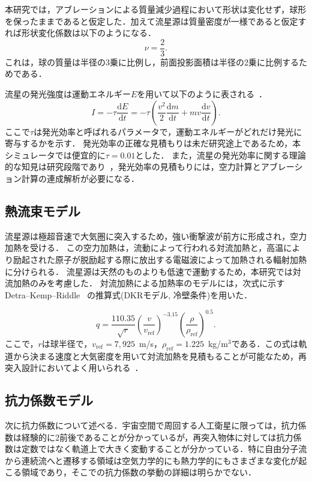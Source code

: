 本研究では，アブレーションによる質量減少過程において形状は変化せず，球形を保ったままであると仮定した．加えて流星源は質量密度が一様であると仮定すれば形状変化係数は以下のようになる．
\begin{equation}
    \label{eq:shape-coeff}
    \nu = \dfrac23.
\end{equation}
これは，球の質量は半径の3乗に比例し，前面投影面積は半径の2乗に比例するためである．

流星の発光強度は運動エネルギー$E$を用いて以下のように表される~\cite{popova2004meteoroid}．
\begin{equation}
	\label{eq:brightness}
	I = -\tau\dfrac{\mathrm{d}E}{\mathrm{d}t} = -\tau\left(\dfrac{v^2}{2}\dfrac{\mathrm{d}m}{\mathrm{d}t} + mv\dfrac{\mathrm{d}v}{\mathrm{d}t}\right).
\end{equation}
ここで$\tau$は発光効率と呼ばれるパラメータで，運動エネルギーがどれだけ発光に寄与するかを示す．
発光効率の正確な見積もりは未だ研究途上であるため，本シミュレータでは便宜的に$\tau = 0.01$とした．
また，流星の発光効率に関する理論的な知見は研究段階であり~\cite{subasinghe2017luminous,subasinghe2018luminous,revelle2001bolide}，発光効率の見積もりには，空力計算とアブレーション計算の連成解析が必要になる．

\subsection{熱流束モデル}
流星源は極超音速で大気圏に突入するため，強い衝撃波が前方に形成され，空力加熱を受ける．
この空力加熱は，流動によって行われる対流加熱と，高温により励起された原子が脱励起する際に放出する電磁波によって加熱される輻射加熱に分けられる．
流星源は天然のものよりも低速で運動するため，本研究では対流加熱のみを考慮した．
対流加熱による加熱率のモデルには，次式に示すDetra–Kemp–Riddle~\cite{kemp1957heat} の推算式(DKRモデル, 冷壁条件)を用いた．

\begin{equation}
    \label{eq:dkr-model}
	q= \dfrac{110.35}{\sqrt{r}} \left(\dfrac{v}{v_\mathrm{ref}}\right)^{-3.15}\left(\dfrac{\rho}{\rho_\mathrm{ref}}\right)^{0.5}.
\end{equation}
ここで，$r$は球半径で，$v_\mathrm{ref} = 7,925$~m/s，$\rho_\mathrm{ref} = 1.225$~kg/m$^3$である．この式は軌道から決まる速度と大気密度を用いて対流加熱を見積もることが可能なため，再突入設計においてよく用いられる~\cite{nagoya-twins}．

\subsection{抗力係数モデル}
次に抗力係数について述べる．宇宙空間で周回する人工衛星に限っては，抗力係数は経験的に2前後であることが分かっているが，再突入物体に対しては抗力係数は定数ではなく軌道上で大きく変動することが分かっている．特に自由分子流から連続流へと遷移する領域は空気力学的にも熱力学的にもさまざまな変化が起こる領域であり，そこでの抗力係数の挙動の詳細は明らかでない．

